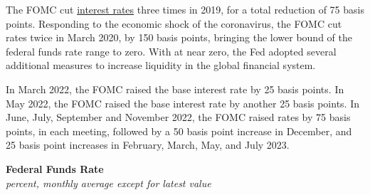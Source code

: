 \documentclass{report}
\makeatletter
\newcommand*\short[1]{\expandafter\@gobbletwo\number\numexpr#1\relax}
\newcommand{\absnode}[3]{\node[below right, align=left] at (axis cs: #1,#2) {#3};}
\newcommand{\dateaxisticks}{
		date coordinates in=x, axis line style={draw=none},
		xmax={2023-11-01},
		max space between ticks=40,	    
		xtick={{1990-01-01}, {1992-01-01}, {1994-01-01}, 
			{1996-01-01}, {1998-01-01}, {2000-01-01}, 
			{2002-01-01}, {2004-01-01}, {2006-01-01},
			{2008-01-01}, {2010-01-01}, {2012-01-01}, {2014-01-01},
		    {2016-01-01}, {2018-01-01}, {2020-01-01}, {2022-01-01}, 
		    {2024-01-01}, {2026-01-01}},
		minor xtick={{1989-01-01}, {1991-01-01}, {1993-01-01},
			{1995-01-01}, {1997-01-01}, {1999-01-01}, 
			{2001-01-01}, {2003-01-01}, {2005-01-01}, {2007-01-01},
		    {2009-01-01}, {2011-01-01}, {2013-01-01}, {2015-01-01},
		    {2017-01-01}, {2019-01-01}, {2021-01-01}, {2023-01-01}, 
		    {2025-01-01}, {2027-01-01}},
		enlarge y limits={0.06}, enlarge x limits={0.01},
		}
\newcommand{\bbar}[2]{extra #1 ticks = {{#2}}, extra #1 tick labels = ,
		extra #1 tick style = {grid=major, grid style={thick, black!25}},}
\newcommand{\stdline}[4]{\addplot[very thick, no markers, color=#1] 
		table [x=#2, y=#3, col sep=comma] {#4};	}
\newcommand{\thickline}[4]{\addplot[ultra thick, no markers, color=#1] 
		table [x=#2, y=#3, col sep=comma] {#4};	}
\newcommand{\rbars}{
		\fill[color=black!10] (axis cs:{1990-07-01},\pgfkeysvalueof{/pgfplots/ymin}) rectangle 
			(axis cs:{1991-03-01}, \pgfkeysvalueof{/pgfplots/ymax});
		\fill[color=black!10] (axis cs:{2007-12-01},\pgfkeysvalueof{/pgfplots/ymin}) rectangle 
			(axis cs:{2009-07-01}, \pgfkeysvalueof{/pgfplots/ymax});
		\fill[color=black!10] (axis cs:{2001-03-01},\pgfkeysvalueof{/pgfplots/ymin}) rectangle 
			(axis cs:{2001-11-01}, \pgfkeysvalueof{/pgfplots/ymax});
		\fill[color=black!10] (axis cs:{2020-02-01},\pgfkeysvalueof{/pgfplots/ymin}) rectangle 
			(axis cs:{2020-05-01}, \pgfkeysvalueof{/pgfplots/ymax});}
\makeatother
\begin{document}
{\begin{minipage}{0.76\textwidth}
The FOMC cut \href{https://www.federalreserve.gov/releases/h15/}{interest rates} three times in 2019, for a total reduction of 75 basis points. Responding to the economic shock of the coronavirus, the FOMC cut rates twice in March 2020, by 150 basis points, bringing the lower bound of the federal funds rate range to zero. With at near zero, the Fed adopted several additional measures to increase liquidity in the global financial system.

In March 2022, the FOMC raised the base interest rate by 25 basis points. In May 2022, the FOMC raised the base interest rate by another 25 basis points. In June, July, September and November 2022, the FOMC raised rates by 75 basis points, in each meeting, followed by a 50 basis point increase in December, and 25 basis point increases in February, March, May, and July 2023. 
\vspace{2mm}

\normalsize \textbf{Federal Funds Rate}\\
\footnotesize{\textit{percent, monthly average except for latest value}}
\vspace{5.5cm}

\hspace{2mm} 


\end{minipage}}
\end{document}
